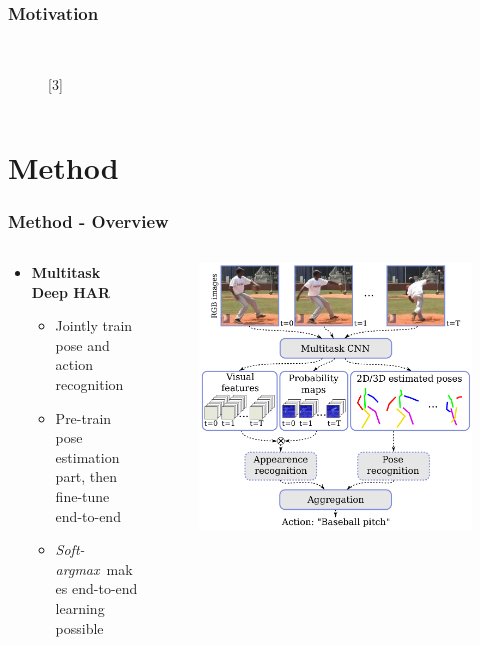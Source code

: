 \documentclass[9pt]{beamer}
\providecommand{\sourcefix}[1]{\\ \footnotesize \tugreen{Source:} [#1]}
\newenvironment{myframe}[1][]{%
\begin{frame}%
\frametitle{#1}
\setcounter{footnote}{0}


}{%
\end{frame}%
}
\begin{document}
\begin{myframe}[Motivation]
\begin{columns}[T]
\begin{column}{.45\textwidth}
\begin{figure}
                \sourcefix{3}
            \end{figure}
        \end{column}
    \end{columns}
\end{myframe}

\tableofcontents

\section{Method}

\begin{myframe}[Method - Overview]
	\begin{columns}[T]
        \begin{column}{.45\textwidth}
            \begin{itemize}
                \item \textbf{Multitask Deep HAR}\footnotemark
                \begin{itemize}
                    \item Jointly train pose and action recognition
                    \item Pre-train pose estimation part, then fine-tune end-to-end
                    \item \textit{Soft-argmax}\footnotemark~makes end-to-end learning possible
                \end{itemize}
            \end{itemize}
        \end{column}
        \begin{column}{.45\textwidth}
            \begin{figure}
                \includegraphics[width=.99\textwidth]{endtoend-concept.png}

\end{figure}
\end{column}
\end{columns}
\end{myframe}
\end{document}
